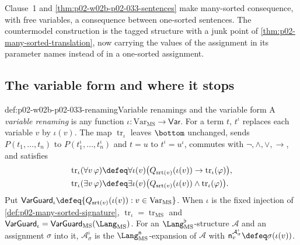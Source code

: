 Clause~1 and \cref{thm:p02-w02b-p02-033-sentences} make many-sorted
consequence, with free variables, a consequence between one-sorted sentences.
The countermodel construction is the tagged structure with a junk point of
\cref{thm:p02-many-sorted-translation}, now carrying the values of the
assignment in its parameter names instead of in a one-sorted assignment.

\subsection{The variable form and where it stops}
\label{sec:p02-w02b-p02-033-variable-form}

\begin{hbdefinition}{def:p02-w02b-p02-033-renaming}{Variable renamings and the variable form}
A \emph{variable renaming} is any function
\(\iota:\mathrm{Var}_{\mathrm{MS}}\to\mathsf{Var}\).  For a term \(t\),
\(t^{\iota}\) replaces each variable \(v\) by \(\iota(v)\).  The map
\(\operatorname{tr}_{\iota}\) leaves \(\bottom\) unchanged, sends
\(P(t_1,\ldots,t_n)\) to \(P(t_1^{\iota},\ldots,t_n^{\iota})\) and \(t=u\) to
\(t^{\iota}=u^{\iota}\), commutes with \(\neg,\land,\lor,\to\), and satisfies
\[
\begin{aligned}
 \operatorname{tr}_{\iota}(\forall v\,\varphi)&\defeq
  \forall\iota(v)\bigl(Q_{\operatorname{srt}(v)}(\iota(v))\to
  \operatorname{tr}_{\iota}(\varphi)\bigr),\\
 \operatorname{tr}_{\iota}(\exists v\,\varphi)&\defeq
  \exists\iota(v)\bigl(Q_{\operatorname{srt}(v)}(\iota(v))\land
  \operatorname{tr}_{\iota}(\varphi)\bigr).
\end{aligned}
\]
Put \(\mathsf{VarGuard}_{\iota}\defeq
\{Q_{\operatorname{srt}(v)}(\iota(v)):v\in\mathrm{Var}_{\mathrm{MS}}\}\).  When
\(\iota\) is the fixed injection of \cref{def:p02-many-sorted-signature},
\(\operatorname{tr}_{\iota}=\operatorname{tr}_{\mathrm{MS}}\) and
\(\mathsf{VarGuard}_{\iota}=\mathsf{VarGuard}_{\mathrm{MS}}(\Lang_{\mathrm{MS}})\).
For an \(\Lang_{\mathrm{MS}}^{\flat}\)-structure \(\mathcal A\) and an
assignment \(\sigma\) into it, \(\mathcal A_{\sigma}^{\iota}\) is the
\(\Lang_{\mathrm{MS}}^{\mathsf n}\)-expansion of \(\mathcal A\) with
\(\mathsf n_v^{\mathcal A_{\sigma}^{\iota}}\defeq\sigma(\iota(v))\).
\end{hbdefinition}

